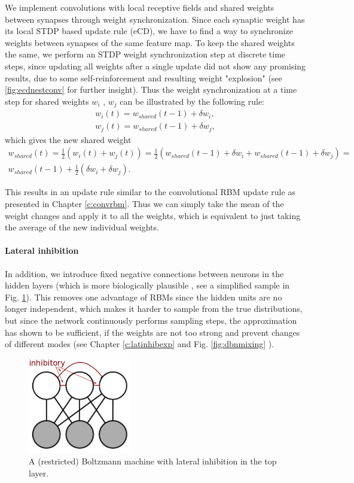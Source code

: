 We implement convolutions with local receptive fields and shared weights between synapses through weight synchronization.
Since each synaptic weight has its local STDP based update rule (eCD), we have to find a way to synchronize weights between synapses of the same feature map.
To keep the shared weights the same, we perform an STDP weight synchronization step at discrete time steps, since updating all weights after a single update did not show any promising results, due to some self-reinforcement and resulting weight "explosion" (see \ref{fig:ecdnestconv} for further insight).
Thus the weight synchronization at a time step for shared weights $w_i$ , $w_j$ can be illustrated by the following rule:  
\[
\begin{split}
w_i(t) = w_{shared}(t-1) + \delta w_i, \\ 
w_j(t) = w_{shared}(t-1) + \delta w_j, 
\end{split}
\]
which gives the new shared weight
\[
\begin{split}
w_{shared}(t) = \frac{1}{2} (w_i(t) + w_j(t) ) = \frac{1}{2} (w_{shared}(t-1) + \delta w_i + w_{shared}(t-1) + \delta w_j) = \\ w_{shared}(t-1) + \frac{1}{2} (\delta w_i + \delta w_j).
\end{split}
\]

This results in an update rule similar to the convolutional RBM update rule as presented in Chapter \ref{c:convrbm}.
Thus we can simply take the mean of the weight changes and apply it to all the weights, which is equivalent to just taking the average of the new individual weights. 

\paragraph{Lateral inhibition} \label{c:latinhib}
In addition, we introduce fixed negative connections between neurons in the hidden layers (which is more biologically plausible \cite{King2013}, see a simplified sample in Fig. \ref{fig:bminhib}).
This removes one advantage of RBMs since the hidden units are no longer independent, which makes it harder to sample from the true distributions, but since the network continuously performs sampling steps, the approximation has shown to be sufficient, if the weights are not too strong and prevent changes of different modes (see Chapter \ref{c:latinhibexp} and Fig. \ref{fig:dbnmixing} ).

\begin{figure}
	\centering
    	\includegraphics[width=0.4\textwidth]{imgs/lateral_inhib.png} 
    \caption{A (restricted) Boltzmann machine with lateral inhibition in the top layer.}
	\label{fig:bminhib}
\end{figure}


